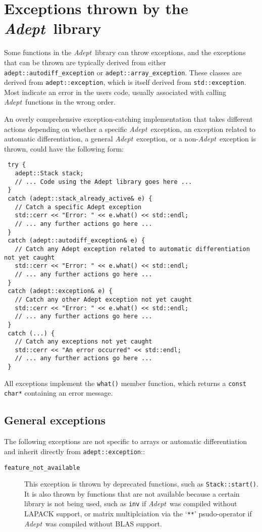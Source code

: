 \documentclass[a4,oneside]{book}
\def\codesize{\small}
\def\Adept{\emph{Adept}}
\def\code#1{{\codesize\texttt{#1}}}
\def\citem#1{\item[{\codesize\texttt{#1}}]}
\begin{document}
\section{Exceptions thrown by the \Adept\ library}
\label{sec:exceptions}
Some functions in the \Adept\ library can throw exceptions, and the
exceptions that can be thrown are typically derived from either
\code{adept::autodiff\_exception} or
\code{adept::array\_exception}. These classes are derived from
\code{adept::exception}, which is itself derived from
\code{std::exception}. Most indicate an error in the users code,
usually associated with calling \Adept\ functions in the wrong order.

An overly comprehensive exception-catching implementation that takes
different actions depending on whether a specific \Adept\ exception,
an exception related to automatic differentiation, a general
\Adept\ exception, or a non-\Adept\ exception is thrown, could have
the following form:
%
\begin{lstlisting}
 try {
   adept::Stack stack;
   // ... Code using the Adept library goes here ...
 }
 catch (adept::stack_already_active& e) {
   // Catch a specific Adept exception
   std::cerr << "Error: " << e.what() << std::endl;
   // ... any further actions go here ...
 }
 catch (adept::autodiff_exception& e) {
   // Catch any Adept exception related to automatic differentiation not yet caught
   std::cerr << "Error: " << e.what() << std::endl;
   // ... any further actions go here ...
 }
 catch (adept::exception& e) {
   // Catch any other Adept exception not yet caught
   std::cerr << "Error: " << e.what() << std::endl;
   // ... any further actions go here ...
 }
 catch (...) {
   // Catch any exceptions not yet caught
   std::cerr << "An error occurred" << std::endl;
   // ... any further actions go here ...
 }
\end{lstlisting}
%
All exceptions implement the \code{what()} member function, which
returns a \code{const char*} containing an error message. 

\subsection{General exceptions}
The following exceptions are not specific to arrays or automatic
differentiation and inherit directly from \code{adept::exception}::
\begin{description}
\citem{feature\_not\_available} This exception is thrown by deprecated
functions, such as \code{Stack::start()}. It is also thrown by
functions that are not available because a certain library is not
being used, such as \code{inv} if \Adept\ was compiled without LAPACK
support, or matrix multiplciation via the `\code{**}' psudo-operator
if \Adept\ was compiled without BLAS support.
\end{description}
\end{document}
